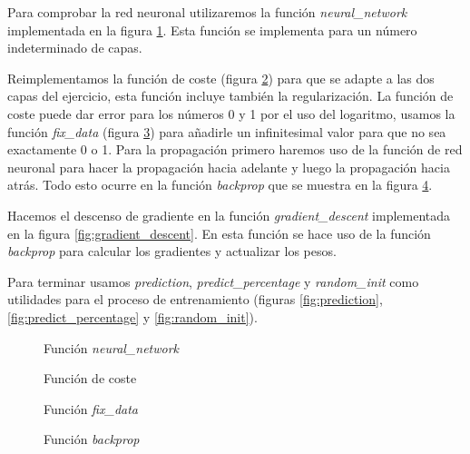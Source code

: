 \documentclass[6pt]{../../shared/AiTex}
\begin{document}
Para comprobar la red neuronal utilizaremos la función \textit{neural\_network} implementada en la figura \ref{fig:neural_network}. Esta función se implementa para un número indeterminado de capas.

Reimplementamos la función de coste (figura \ref{cost}) para que se adapte a las dos capas del ejercicio, esta función incluye también la regularización. La función de coste puede dar error para los números 0 y 1 por el uso del logaritmo, usamos la función \textit{fix\_data} (figura \ref{fig:fix_data}) para añadirle un infinitesimal valor para que no sea exactamente 0 o 1. Para la propagación primero haremos uso de la función de red neuronal para hacer la propagación hacia adelante y luego la propagación hacia atrás. Todo esto ocurre en la función \textit{backprop} que se muestra en la figura \ref{fig:backprop}.

Hacemos el descenso de gradiente en la función \textit{gradient\_descent} implementada en la figura \ref{fig:gradient_descent}. En esta función se hace uso de la función \textit{backprop} para calcular los gradientes y actualizar los pesos.

Para terminar usamos \textit{prediction}, \textit{predict\_percentage} y \textit{random\_init} como utilidades para el proceso de entrenamiento (figuras \ref{fig:prediction}, \ref{fig:predict_percentage} y \ref{fig:random_init}).

\begin{figure}[H]
    \centering
    
    \caption{Función \textit{neural\_network}}
    \label{fig:neural_network}
\end{figure}

\begin{figure}[H]
    \centering
    
    \caption{Función de coste}
    \label{cost}
\end{figure}

\begin{figure}[H]
    \centering
    
    \caption{Función \textit{fix\_data}}
    \label{fig:fix_data}
\end{figure}

\begin{figure}[H]
    \centering
    
    \caption{Función \textit{backprop}}
    \label{fig:backprop}
\end{figure}
\end{document}
